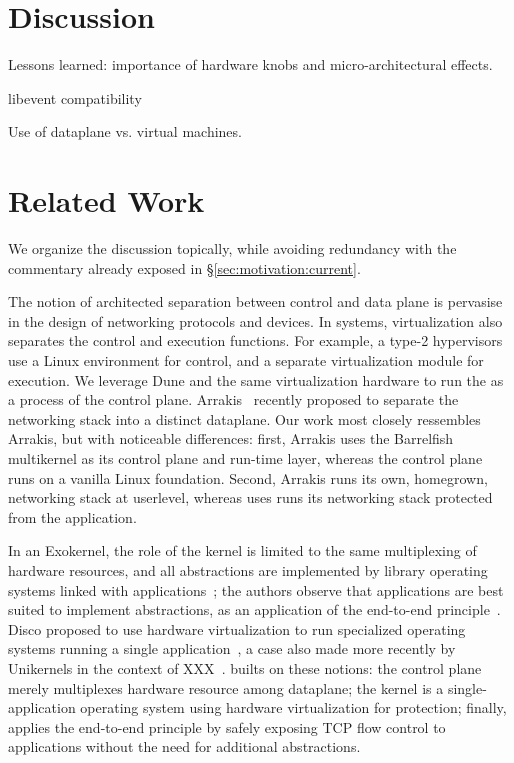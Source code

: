 

\section{Discussion}

\todo Lessons learned: importance of hardware knobs and micro-architectural effects.

\todo libevent compatibility

\todo Use of dataplane vs. virtual machines. 

\section{Related Work}

We organize the discussion topically, while avoiding redundancy with
the commentary already exposed in \S\ref{sec:motivation:current}.


 The notion of
architected separation between control and data plane is pervasise in
the design of networking protocols and devices.  In systems,
virtualization also separates the control and execution functions. For
example, a type-2
hypervisors~\cite{DBLP:journals/tocs/BugnionDRSW12,misc/kivity07kvm}
use a Linux environment for control, and a separate virtualization
module for execution.  We leverage Dune and the same virtualization
hardware to run the \ix as a process of the control plane.
Arrakis~\cite{peter2013arrakis,arrakisTR13} recently proposed to
separate the networking stack into a distinct dataplane.  Our work
most closely ressembles Arrakis, but with noticeable differences:
first, Arrakis uses the Barrelfish multikernel as its control plane
and run-time layer, whereas the \ix control plane runs on a vanilla
Linux foundation.  Second, Arrakis runs its own, homegrown, networking
stack at userlevel, whereas \ix uses runs its networking stack
protected from the application.

In an Exokernel, the role of the kernel is limited to the same
multiplexing of hardware resources, and all abstractions are
implemented by library operating systems linked with
applications~\cite{DBLP:conf/sosp/EnglerKO95}; the authors observe
that applications are best suited to implement abstractions, as an
application of the end-to-end
principle~\cite{DBLP:journals/tocs/SaltzerRC84}.  Disco proposed to
use hardware virtualization to run specialized operating systems
running a single application~\cite{DBLP:journals/tocs/BugnionDGR97}, a
case also made more recently by Unikernels in the context of
XXX~\cite{DBLP:conf/asplos/MadhavapeddyMRSSGSHC13}.  \ix builts on
these notions: the control plane merely multiplexes hardware resource
among dataplane; the \ix kernel is a single-application operating
system using hardware virtualization for protection; finally, \ix
applies the end-to-end principle by safely exposing TCP flow control
to applications without the need for additional abstractions.



